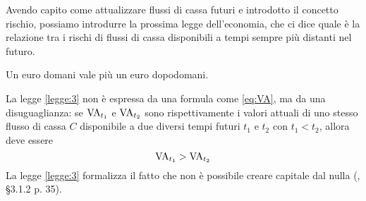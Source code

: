 Avendo capito come attualizzare flussi di cassa futuri e introdotto il concetto rischio, possiamo introdurre
la prossima legge dell'economia, che ci dice quale è la relazione tra i rischi di flussi di cassa disponibili
a tempi sempre più distanti nel futuro.

\begin{legge}\label{legge:3}
  Un euro domani vale più un euro dopodomani.
\end{legge}
La legge \ref{legge:3} non è espressa da una formula come \eqref{eq:VA}, ma da una disuguaglianza:
se $\mathrm{VA}_{t_1}$ e $\mathrm{VA}_{t_2}$ sono rispettivamente i valori attuali di uno stesso flusso di cassa $C$
disponibile a due diversi tempi futuri $t_1$ e $t_2$ con $t_1<t_2$, allora deve essere
\begin{equation}
  \label{eq:legge3}
  \mathrm{VA}_{t_1}>\mathrm{VA}_{t_2}
\end{equation}
La legge \ref{legge:3} formalizza il fatto che non è possibile creare capitale dal nulla (\cite{brealey_et_al1999},
§3.1.2 p. 35).